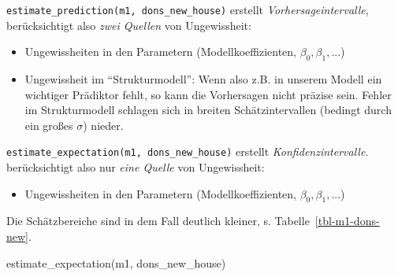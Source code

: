 \documentclass[
  a4paper,
  DIV=11]{scrreprt}
\newenvironment{Shaded}{\begin{snugshade}}{\end{snugshade}}
\newcommand{\FunctionTok}[1]{\textcolor[rgb]{0.28,0.35,0.67}{#1}}
\newcommand{\NormalTok}[1]{\textcolor[rgb]{0.00,0.23,0.31}{#1}}
\providecommand{\tightlist}{%
  \setlength{\itemsep}{0pt}\setlength{\parskip}{0pt}}\usepackage{longtable,booktabs,array}
\theoremstyle{definition}
\theoremstyle{remark}
\begin{document}
\texttt{estimate\_prediction(m1,\ dons\_new\_house)} erstellt
\emph{Vorhersageintervalle}, berücksichtigt also \emph{zwei Quellen} von
Ungewissheit:

\begin{itemize}
\tightlist
\item
  Ungewissheiten in den Parametern (Modellkoeffizienten,
  \(\beta_0, \beta_1, ...\))
\item
  Ungewissheit im ``Strukturmodell'': Wenn also z.B. in unserem Modell
  ein wichtiger Prädiktor fehlt, so kann die Vorhersagen nicht präzise
  sein. Fehler im Strukturmodell schlagen sich in breiten
  Schätzintervallen (bedingt durch ein großes \(\sigma\)) nieder.
\end{itemize}

\texttt{estimate\_expectation(m1,\ dons\_new\_house)} erstellt
\emph{Konfidenzintervalle}. berücksichtigt also nur \emph{eine Quelle}
von Ungewissheit:

\begin{itemize}
\tightlist
\item
  Ungewissheiten in den Parametern (Modellkoeffizienten,
  \(\beta_0, \beta_1, ...\))
\end{itemize}

Die Schätzbereiche sind in dem Fall deutlich kleiner, s.
Tabelle~\ref{tbl-m1-dons-new}.

\begin{Shaded}
\begin{Highlighting}[]
\FunctionTok{estimate\_expectation}\NormalTok{(m1, dons\_new\_house)}
\end{Highlighting}
\end{Shaded}
\end{document}
